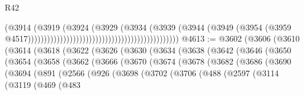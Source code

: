 \begin{lexlean}{R42}
\begin{coremodule}
                                                                              (@3914
                                                                                (@3919
                                                                                  (@3924
                                                                                    (@3929
                                                                                      (@3934
                                                                                        (@3939
                                                                                          (@3944
                                                                                            (@3949
                                                                                              (@3954
                                                                                                (@3959
                                                                                                  @4517)))))))))))))))))))))))))))))))))))))))))))))))
@4613 := @3602
    (@3606
      (@3610
        (@3614
          (@3618
            (@3622
              (@3626
                (@3630
                  (@3634
                    (@3638
                      (@3642
                        (@3646
                          (@3650
                            (@3654
                              (@3658
                                (@3662
                                  (@3666
                                    (@3670
                                      (@3674
                                        (@3678
                                          (@3682
                                            (@3686
                                              (@3690
                                                (@3694
                                                  (@891
                                                    (@2566
                                                      (@926
                                                        (@3698
                                                          (@3702
                                                            (@3706
                                                              (@488
                                                                (@2597
                                                                  (@3114
                                                                    (@3119
                                                                      (@469
                                                                        (@483

\end{coremodule}
\end{lexlean}
